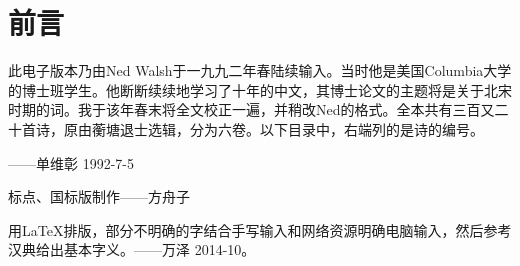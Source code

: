 \documentclass[12pt,oneside]{book}
\begin{document}
\frontmatter

\author{蘅塘退士}
\titleLA

\chapter*{前言}
\begin{common-format}
此电子版本乃由Ned Walsh于一九九二年春陆续输入。当时他是美国Columbia大学的博士班学生。他断断续续地学习了十年的中文，其博士论文的主题将是关于北宋时期的词。我于该年春末将全文校正一遍，并稍改Ned的格式。全本共有三百又二十首诗，原由蘅塘退士选辑，分为六卷。以下目录中，右端列的是诗的编号。

——单维彰 1992-7-5

标点、国标版制作——方舟子

用\LaTeX 排版，部分不明确的字结合手写输入和网络资源明确电脑输入，然后参考汉典给出基本字义。——万泽 2014-10。


\end{common-format}


\setcounter{tocdepth}{2}
\tableofcontents
\end{document}
